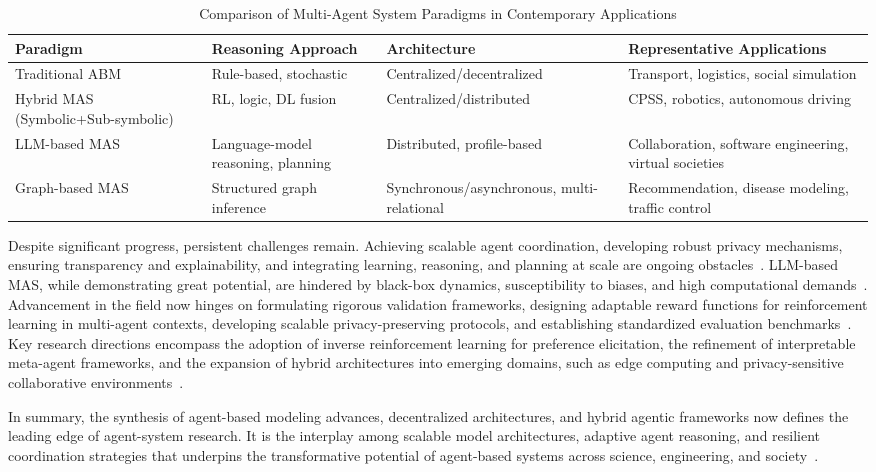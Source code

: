\documentclass[sigconf]{acmart}
\begin{document}
\begin{table*}[htbp]
\centering
\caption{Comparison of Multi-Agent System Paradigms in Contemporary Applications}
\label{tab:mas_comparison}
\begin{adjustbox}{max width=\textwidth}
\begin{tabular}{@{}llll@{}}
\toprule
\textbf{Paradigm} & \textbf{Reasoning Approach} & \textbf{Architecture} & \textbf{Representative Applications} \\
\midrule
Traditional ABM & Rule-based, stochastic & Centralized/decentralized & Transport, logistics, social simulation \\
Hybrid MAS (Symbolic+Sub-symbolic) & RL, logic, DL fusion & Centralized/distributed & CPSS, robotics, autonomous driving \\
LLM-based MAS & Language-model reasoning, planning & Distributed, profile-based & Collaboration, software engineering, virtual societies \\
Graph-based MAS & Structured graph inference & Synchronous/asynchronous, multi-relational & Recommendation, disease modeling, traffic control \\
\bottomrule
\end{tabular}
\end{adjustbox}
\end{table*}

Despite significant progress, persistent challenges remain. Achieving scalable agent coordination, developing robust privacy mechanisms, ensuring transparency and explainability, and integrating learning, reasoning, and planning at scale are ongoing obstacles~\cite{ref101,ref104,ref103,ref105,ref106}. LLM-based MAS, while demonstrating great potential, are hindered by black-box dynamics, susceptibility to biases, and high computational demands~\cite{ref101,ref105}. Advancement in the field now hinges on formulating rigorous validation frameworks, designing adaptable reward functions for reinforcement learning in multi-agent contexts, developing scalable privacy-preserving protocols, and establishing standardized evaluation benchmarks~\cite{ref101,ref103,ref104,ref105,ref106,ref113,ref114,ref115}. Key research directions encompass the adoption of inverse reinforcement learning for preference elicitation, the refinement of interpretable meta-agent frameworks, and the expansion of hybrid architectures into emerging domains, such as edge computing and privacy-sensitive collaborative environments~\cite{ref103,ref104,ref105}.

In summary, the synthesis of agent-based modeling advances, decentralized architectures, and hybrid agentic frameworks now defines the leading edge of agent-system research. It is the interplay among scalable model architectures, adaptive agent reasoning, and resilient coordination strategies that underpins the transformative potential of agent-based systems across science, engineering, and society~\cite{ref13,ref22,ref25,ref26,ref27,ref41,ref42,ref43,ref44,ref54,ref55,ref56,ref60,ref69,ref70,ref83,ref85,ref101,ref103,ref104,ref105,ref106,ref112,ref113,ref114,ref115}.
\end{document}
